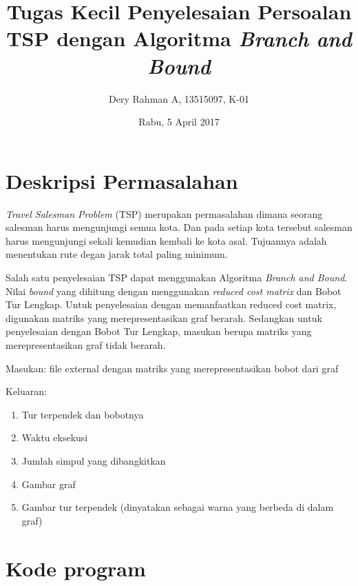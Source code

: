 \documentclass{article}
\title{Tugas Kecil Penyelesaian Persoalan TSP dengan Algoritma \textit{Branch and Bound}}
\author{Dery Rahman A, 13515097, K-01}
\date{Rabu, 5 April 2017}
\begin{document}
	\maketitle

	\newpage

	\section{Deskripsi Permasalahan}
	\par \textit{Travel Salesman Problem} (TSP) merupakan permasalahan dimana seorang salesman harus mengunjungi semua kota. Dan pada setiap kota tersebut salesman harus mengunjungi sekali kemudian kembali ke kota asal. Tujuannya adalah menentukan rute degan jarak total paling minimum.
	\par Salah satu penyelesaian TSP dapat menggunakan Algoritma \textit{Branch and Bound}. Nilai \textit{bound} yang dihitung dengan menggunakan \textit{reduced cost matrix} dan Bobot Tur Lengkap. Untuk penyelesaian dengan memanfaatkan reduced cost matrix, digunakan matriks yang merepresentasikan graf berarah. Sedangkan untuk penyelesaian dengan Bobot Tur Lengkap, masukan berupa matriks yang merepresentasikan graf tidak berarah.
	\par Masukan: file external dengan matriks yang merepresentasikan bobot dari graf
	
	\par Keluaran:
\begin{enumerate}
	\setlength\itemsep{0em}
	\item Tur terpendek dan bobotnya
    \item Waktu eksekusi    
    \item Jumlah simpul yang dibangkitkan
    \item Gambar graf
    \item Gambar tur terpendek (dinyatakan sebagai warna yang berbeda di dalam graf)
\end{enumerate}

	\section{Kode program}
	
	
	
	
\end{document}
